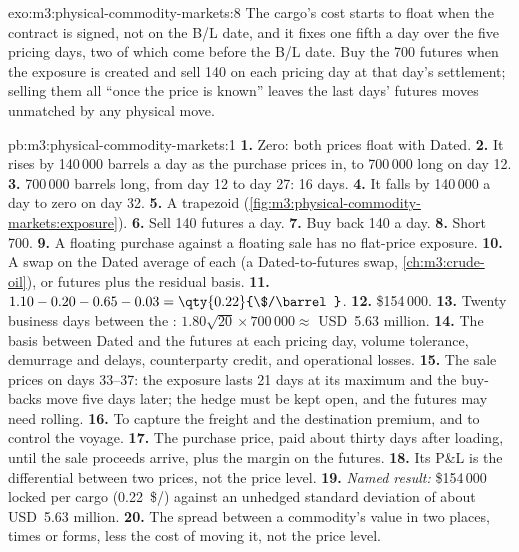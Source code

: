 \begin{solution}{exo:m3:physical-commodity-markets:8}
The cargo's cost starts to float when the contract is signed, not on the B/L date,
and it fixes one fifth a day over the five pricing days, two of which come before
the B/L date. Buy the 700 futures when the exposure is created and sell 140 on each
pricing day at that day's settlement; selling them all ``once the price is known''
leaves the last days' futures moves unmatched by any physical move.
\end{solution}

\begin{solution}{pb:m3:physical-commodity-markets:1}
\textbf{1.} Zero: both prices float with Dated. \textbf{2.} It rises by 140\,000
barrels a day as the purchase prices in, to 700\,000 long on day 12. \textbf{3.}
700\,000 barrels long, from day 12 to day 27: 16 days. \textbf{4.} It falls by
140\,000 a day to zero on day 32. \textbf{5.} A trapezoid
(\cref{fig:m3:physical-commodity-markets:exposure}).
\textbf{6.} Sell 140 futures a day. \textbf{7.} Buy back 140 a day.
\textbf{8.} Short 700. \textbf{9.} A floating purchase against a floating sale has
no flat-price exposure. \textbf{10.} A swap on the Dated average of each  (a Dated-to-futures swap, \cref{ch:m3:crude-oil}), or futures plus the
residual basis.
\textbf{11.} $1.10 - 0.20 - 0.65 - 0.03 = \qty{0.22}{\$/\barrel}$. \textbf{12.}
\$154\,000. \textbf{13.} Twenty business days between the :
$1.80\sqrt{20} \times 700\,000 \approx$ USD~5.63 million. \textbf{14.} The basis
between Dated and the futures at each pricing day, volume tolerance, demurrage and
delays, counterparty credit, and operational losses. \textbf{15.} The sale prices on
days 33--37: the exposure lasts 21 days at its maximum and the buy-backs move five
days later; the hedge must be kept open, and the futures may need rolling.
\textbf{16.} To capture the freight and the destination premium, and to control the
voyage. \textbf{17.} The purchase price, paid about thirty days after loading,
until the sale proceeds arrive, plus the margin on the futures. \textbf{18.} Its P\&L
is the differential between two prices, not the price level. \textbf{19.}
\emph{Named result:} \$154\,000 locked per cargo (\qty{0.22}{\$/\barrel}) against an
unhedged standard deviation of about USD~5.63 million. \textbf{20.} The spread
between a commodity's value in two places, times or forms, less the cost of moving
it, not the price level.
\end{solution}

